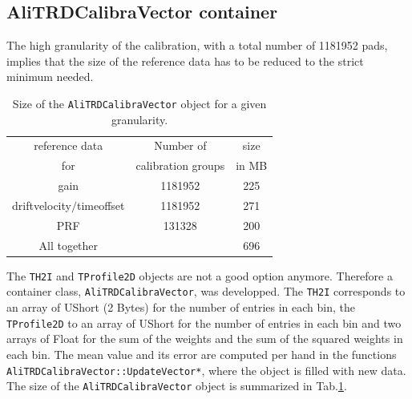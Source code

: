 \documentclass{alicetdr}
\begin{document}
\subsection{AliTRDCalibraVector container}
The high granularity of the calibration, with a total number of 1181952 
pads, implies that the size of the reference data has to be reduced to 
the strict minimum needed.
\begin{table}[h]
\begin{center}
\begin{tabular} {|c|c|c|}
\hline reference data & Number of  & size  \\
 for & calibration groups  & in MB   \\\hline
 gain & 1181952 & 225 \\\hline
 driftvelocity$/$timeoffset & 1181952 & 271 \\\hline
 PRF  & 131328  & 200 \\\hline
 All together & & 696 \\\hline
\end{tabular} 
\caption{\label{sizeofAliTRDCalibraVector} Size of the 
{\tt AliTRDCalibraVector} object for a given granularity.} 
\end{center}
\end{table}

The {\tt TH2I} and {\tt TProfile2D} objects are not a good option 
anymore. Therefore a container class, {\tt AliTRDCalibraVector}, was 
developped. The {\tt TH2I} corresponds to an array of UShort (2 Bytes) 
for the number of entries in each bin, the {\tt TProfile2D} to an array 
of UShort for the number of entries in each bin and two arrays of Float 
for the sum of the weights and the sum of the squared weights in each 
bin. The mean value and its error are computed per hand in the functions 
{\tt AliTRDCalibraVector::UpdateVector*}, where the object is filled 
with new data. The size of the {\tt AliTRDCalibraVector} object is 
summarized in Tab.\ref{sizeofAliTRDCalibraVector}.\\
%
\end{document}
